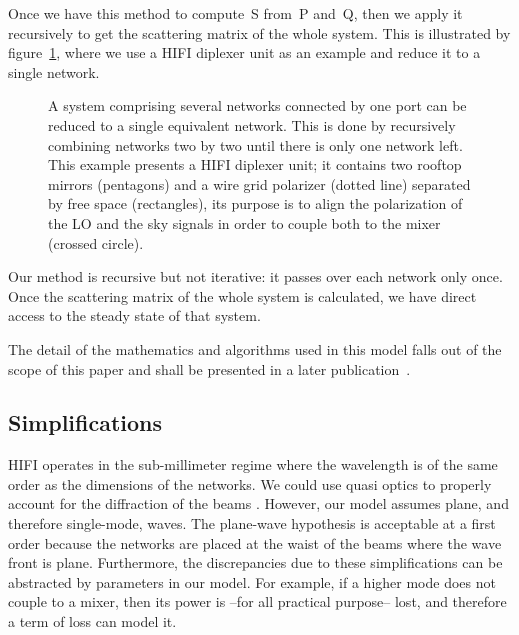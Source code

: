 \documentclass[a4paper,11pt]{article}
\begin{document}
Once we have this method to compute~S from~P and~Q, then we apply it recursively to get the scattering matrix of the whole system.
This is illustrated by figure~\ref{fig:cascading_example}, where we use a HIFI diplexer unit as an example and reduce it to a single network.
\begin{figure}[hbtp]
    \centering
    
    \caption{\label{fig:cascading_example}
    A system comprising several networks connected by one port can be reduced to a single equivalent network.
    This is done by recursively combining networks two by two until there is only one network left.
    This example presents a HIFI diplexer unit; it contains two rooftop mirrors (pentagons) and a wire grid polarizer (dotted line) separated by free space (rectangles), its purpose is to align the polarization of the LO and the sky signals in order to couple both to the mixer (crossed circle).
    }
\end{figure}

Our method is recursive but not iterative: it passes over each network only once.
Once the scattering matrix of the whole system is calculated, we have direct access to the steady state of that system.

The detail of the mathematics and algorithms used in this model falls out of the scope of this paper and shall be presented in a later publication~\cite{delforge_2014_phdthesis}.


\subsection{Simplifications}

HIFI operates in the sub-millimeter regime where the wavelength is of the same order as the dimensions of the networks.
We could use quasi optics to properly account for the diffraction of the beams \cite{goldsmith1998quasioptical}.
However, our model assumes plane, and therefore single-mode, waves.
The plane-wave hypothesis is acceptable at a first order because the networks are placed at the waist of the beams where the wave front is plane.
Furthermore, the discrepancies due to these simplifications can be abstracted by parameters in our model.
For example, if a higher mode does not couple to a mixer, then its power is --for all practical purpose-- lost, and therefore a term of loss can model it.
\end{document}
